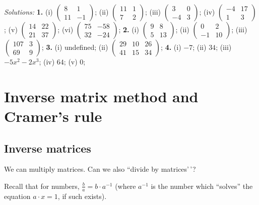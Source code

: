\documentclass[
  12pt,
  oneside]{book}
\theoremstyle{definition}
\theoremstyle{definition}
\theoremstyle{definition}
\theoremstyle{definition}
\theoremstyle{remark}
\begin{document}
\emph{Solutions:}
\textbf{1.} (i) \(\begin{pmatrix}8&1\\11&-1\end{pmatrix}\);
(ii) \(\begin{pmatrix}11&1\\7&2\end{pmatrix}\);
(iii) \(\begin{pmatrix}3&0\\-4&3\end{pmatrix}\);
(iv) \(\begin{pmatrix}-4&17\\1&3\end{pmatrix}\);
(v) \(\begin{pmatrix}14&22\\21&37\end{pmatrix}\);
(vi) \(\begin{pmatrix}75&-58\\32&-24\end{pmatrix}\);
\textbf{2.} (i) \(\begin{pmatrix}9&8\\5&13\end{pmatrix}\);
(ii) \(\begin{pmatrix}0&2\\-1&10\end{pmatrix}\);
(iii) \(\begin{pmatrix}107&3\\69&9\end{pmatrix}\);
\textbf{3.} (i) undefined; (ii) \(\begin{pmatrix}29&10&26\\41&15&34\end{pmatrix}\);
\textbf{4.} (i) \(-7\); (ii) \(34\); (iii) \(-5x^2-2x^3\); (iv) \(64\); (v) \(0\);

\chapter{Inverse matrix method and Cramer's rule}\label{inverse-matrix-method-and-cramers-rule}

\section{Inverse matrices}\label{inverse-matrices}

We can multiply matrices. Can we also ``divide by matrices'\,'?

Recall that for numbers, \(\frac{b}{a} = b \cdot a^{-1}\) (where \(a^{-1}\) is the number which ``solves'' the equation \(a\cdot x = 1\), if such exists).
\end{document}
